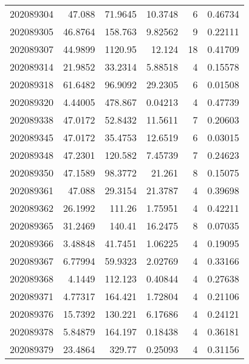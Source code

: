 \begin{tabular}{rrrrrr}
 202089304 &         47.088   &       71.9645 &           10.3748  &           6 & 0.46734 \\
 202089305 &         46.8764  &      158.763  &            9.82562 &           9 & 0.22111 \\
 202089307 &         44.9899  &     1120.95   &           12.124   &          18 & 0.41709 \\
 202089314 &         21.9852  &       33.2314 &            5.88518 &           4 & 0.15578 \\
 202089318 &         61.6482  &       96.9092 &           29.2305  &           6 & 0.01508 \\
 202089320 &          4.44005 &      478.867  &            0.04213 &           4 & 0.47739 \\
 202089338 &         47.0172  &       52.8432 &           11.5611  &           7 & 0.20603 \\
 202089345 &         47.0172  &       35.4753 &           12.6519  &           6 & 0.03015 \\
 202089348 &         47.2301  &      120.582  &            7.45739 &           7 & 0.24623 \\
 202089350 &         47.1589  &       98.3772 &           21.261   &           8 & 0.15075 \\
 202089361 &         47.088   &       29.3154 &           21.3787  &           4 & 0.39698 \\
 202089362 &         26.1992  &      111.26   &            1.75951 &           4 & 0.42211 \\
 202089365 &         31.2469  &      140.41   &           16.2475  &           8 & 0.07035 \\
 202089366 &          3.48848 &       41.7451 &            1.06225 &           4 & 0.19095 \\
 202089367 &          6.77994 &       59.9323 &            2.02769 &           4 & 0.33166 \\
 202089368 &          4.1449  &      112.123  &            0.40844 &           4 & 0.27638 \\
 202089371 &          4.77317 &      164.421  &            1.72804 &           4 & 0.21106 \\
 202089376 &         15.7392  &      130.221  &            6.17686 &           4 & 0.24121 \\
 202089378 &          5.84879 &      164.197  &            0.18438 &           4 & 0.36181 \\
 202089379 &         23.4864  &      329.77   &            0.25093 &           4 & 0.31156 \\

\end{tabular}

